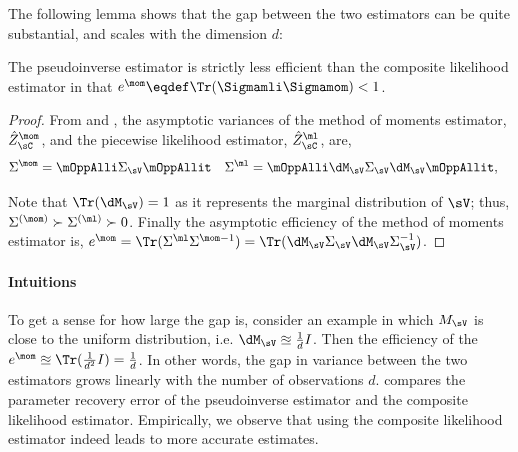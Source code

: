 
The following lemma shows that the gap between the two estimators can be quite substantial,
and scales with the dimension $d$: %
\begin{corollary}
The pseudoinverse estimator is strictly less efficient
than the composite likelihood estimator in that $e^\mom \eqdef \Tr(\Sigmamli \Sigmamom) < 1$.
\end{corollary}
\begin{proof}
  From  and , the asymptotic variances of the method of moments estimator, $\hat Z_\sC^{\mom}$, and the piecewise likelihood estimator, $\hat Z_\sC^{\ml}$, are,
  \begin{align*}
    \Sigma^{\mom} &= \mOppAlli \Sigma_\sV \mOppAllit & \Sigma^{\ml} &= \mOppAlli \dM_\sV \Sigma_\sV \dM_\sV \mOppAllit,
  \end{align*}

  Note that $\Tr(\dM_\sV) = 1$ as it represents the marginal
  distribution of $\sV$; thus, $\Sigma^{(\mom)} \succ \Sigma^{(\ml)}
  \succ 0$.  Finally the asymptotic efficiency of the method of moments
  estimator is, $e^\mom = \Tr( \Sigma^{\ml}\Sigma^{\mom -1} ) = \Tr( \dM_\sV \Sigma_\sV \dM_\sV \Sigma_\sV^{-1} )$.
\end{proof}

\paragraph{Intuitions}
To get a sense for how large the gap is, consider an example in which
$M_\sV$ is close to the uniform distribution, i.e. $\dM_\sV
  \approxeq \frac{1}{d} I$. 
Then the efficiency of the $e^\mom \approxeq \Tr(\frac{1}{d^2} I) = \frac{1}{d}$.
In other words, the gap in variance between the two estimators
grows linearly with the number of observations $d$.
 compares the parameter recovery error of the
  pseudoinverse estimator and the composite likelihood estimator.
Empirically, we observe that using the composite likelihood estimator indeed leads to more accurate estimates.


